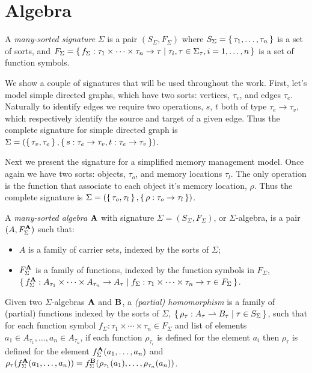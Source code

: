 \section{Algebra}\label{sec:algebra}

\begin{definition}
  A \emph{many-sorted signature} $\Sigma$ is a pair $(S_\Sigma, F_\Sigma)$ where $S_\Sigma = \set{\tau_1, \ldots,
  \tau_n}$ is a set of sorts, and $F_\Sigma = \set{f_\Sigma : \tau_1 \times \cdots \times \tau_n \to \tau | \tau_i, \tau
  \in \Sigma_\tau, i = 1, \ldots, n}$ is a set of function symbols.
\end{definition}

We show a couple of signatures that will be used throughout the work. First, let's model simple directed graphs, which
have two sorts: vertices, $\tau_v$, and edges $\tau_e$. Naturally to identify edges we require two operations, $s$, $t$
both of type $\tau_e \to \tau_v$, which respectively identify the source and target of a given edge. Thus the complete
signature for simple directed graph is $\Sigma = (\set{\tau_v, \tau_e}, \set{s : \tau_e \to \tau_v, t : \tau_e \to
\tau_v})$.

Next we present the signature for a simplified memory management model. Once again we have two sorts: objects, $\tau_o$, and
memory locations $\tau_l$. The only operation is the function that associate to each object it's memory location,
$\rho$. Thus the complete signature is $\Sigma = (\set{\tau_o, \tau_l}, \set{\rho : \tau_o \to \tau_l})$.

\begin{definition}
  A \emph{many-sorted algebra} $\mathbf{A}$ with signature $\Sigma = (S_\Sigma, F_\Sigma)$, or $\Sigma$-algebra, is a
  pair $(A, F_\Sigma^{\mathbf{A}})$ such that:
  \begin{itemize}
    \item $A$ is a family of carrier sets, indexed by the sorts of $\Sigma$;
    \item $F_\Sigma^{\mathbf{A}}$ is a family of functions, indexed by the function symbols in $F_\Sigma$,
      $\set{f_\Sigma^{\mathbf{A}} : A_{\tau_1} \times \cdots \times A_{\tau_n} \to A_\tau | f_\Sigma : \tau_1 \times
      \cdots \times \tau_n \to \tau \in F_\Sigma}$.
  \end{itemize}
\end{definition}

\begin{definition}[Homomorphism]
  Given two $\Sigma$-algebras $\mathbf{A}$ and $\mathbf{B}$, a \emph{(partial)
  homomorphism} is a family of (partial) functions indexed by the sorts of $\Sigma$, $\set{\rho_\tau : A_\tau
  \rightharpoonup B_\tau | \tau \in S_\Sigma}$, such that for each function symbol $f_\Sigma : \tau_1 \times \cdots \times
  \tau_n \in F_\Sigma$ and list of elements $a_1 \in A_{\tau_1}, \ldots, a_n \in A_{\tau_n}$, if each function
  $\rho_{\tau_i}$ is defined for the element $a_i$ then $\rho_\tau$ is defined for the element $f_\Sigma^{\mathbf{A}}(a_1,
  \ldots, a_n)$ and $\rho_\tau(f_\Sigma^{\mathbf{A}}(a_1, \ldots, a_n)) = f_\Sigma^{\mathbf{B}}(\rho_{\tau_1}(a_1),
  \ldots, \rho_{\tau_n}(a_n))$.
\end{definition}

